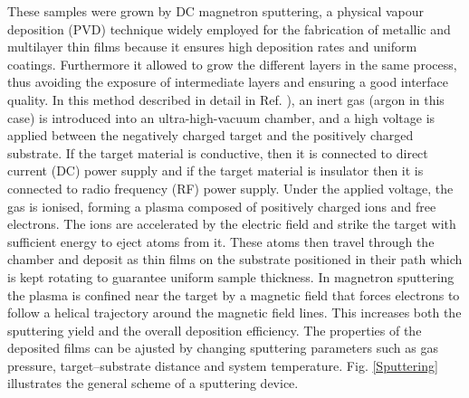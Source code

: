\documentclass[12pt,a4paper,oneside,openany]{book}
\begin{document}
These samples were grown by DC magnetron sputtering, a physical vapour deposition (PVD) technique widely employed for the fabrication of metallic and multilayer thin films because it ensures high deposition rates and uniform coatings. Furthermore it allowed to grow the different layers in the same process, thus avoiding the exposure of intermediate layers and ensuring a good interface quality. In this method described in detail in Ref. \cite{Sputtering}), an inert gas (argon in this case) is introduced into an ultra-high-vacuum chamber, and a high voltage is applied between the negatively charged target and the positively charged substrate. If the target material is conductive, then it is connected to direct current (DC) power supply and if the target material is insulator then it is connected to radio frequency (RF) power supply. Under the applied voltage, the gas is ionised, forming a plasma composed of positively charged ions and free electrons. The ions are accelerated by the electric field and strike the target with sufficient energy to eject atoms from it. These atoms then travel through the chamber and deposit as thin films on the substrate positioned in their path which is kept rotating to guarantee uniform sample thickness. In magnetron sputtering the plasma is confined near the target by a magnetic field that forces electrons to follow a helical trajectory around the magnetic field lines. This increases both the sputtering yield and the overall deposition efficiency. The properties of the deposited films can be ajusted by changing sputtering parameters such as gas pressure, target–substrate distance and system temperature. Fig. \ref{Sputtering} illustrates the general scheme of a sputtering device. \\
\end{document}
